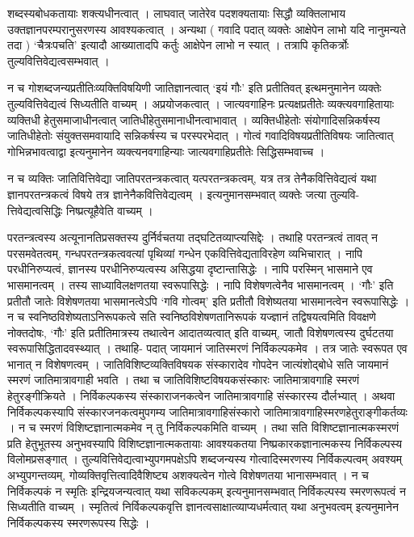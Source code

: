 {शब्दस्यबोधकतायाः शक्त्यधीनत्वात् । लाघवात् जातेरेव पदशक्यतायाः सिद्धौ व्यक्तिलाभाय उक्तज्ञानपरम्परानुसरणस्य आवश्यकत्वात् । अन्यथा ( गवादि पदात् व्यक्तेः आक्षेपेन लाभो यदि नानुमन्यते तदा ) ‘चैत्रःपचति’ इत्यादौ आख्यातादपि कर्तुः आक्षेपेन लाभो न स्यात् । तत्रापि कृतिकर्त्रोः तुल्यवित्तिवेद्यत्वसम्भवात् । 

न च गोशब्दजन्यप्रतीतिःव्यक्तिविषयिणी जातिज्ञानत्वात् ‘इयं गौः’ इति प्रतीतिवत् इत्थमनुमानेन व्यक्तेः तुल्यवित्तिवेद्यत्वं सिध्यतीति वाच्यम् । अप्रयोजकत्वात् ।  जात्यवगाहिनः प्रत्यक्षप्रतीतेः व्यक्त्यवगाहितायाः व्यक्तिधी हेतुसमाजाधीनत्वात् जातिधीहेतुसमानाधीनत्वाभावात् । व्यक्तिधीहेतोः संयोगादिसन्निकर्षस्य जातिधीहेतोः संयुक्तसमवायादि सन्निकर्षस्य च परस्परभेदात् । गोत्वं गवादिविषयप्रतीतिविषयः जातित्वात् गोभिन्नभावत्वाद्वा इत्यनुमानेन व्यक्त्यनवगाहिन्याः जात्यवगाहिप्रतीतेः सिद्धिसम्भवाच्च । 

न च व्यक्तिः जातिवित्तिवेद्या जातिपरतन्त्रकत्वात् यत्परतन्त्रकत्वम्, यत्र तत्र तेनैकवित्तिवेद्यत्वं यथा ज्ञानपरतन्त्रकत्वं विषये तत्र ज्ञानेनैकवित्तिवेद्यत्वम् । इत्यनुमानसम्भवात् व्यक्तेः जत्या तुल्यवि- त्तिवेद्यत्वसिद्धिः निष्प्रत्यूहैवेति वाच्यम् ।

परतन्त्रत्वस्य अत्यूनानतिप्रसक्तस्य दुर्निर्वचतया तद्घटितव्याप्त्यसिद्देः । तथाहि परतन्त्रत्वं तावत् न परसमवेतत्वम्, गन्धपरतन्त्रकत्ववत्यां पृथिव्यां गन्धेन एकवित्तिवेद्यताविरहेण व्यभिचारात् । नापि परधीनिरुप्यत्वं, ज्ञानस्य परधीनिरुप्यत्वस्य असिद्धया दृष्टान्तासिद्धेः । नापि परस्मिन् भासमाने एव भासमानत्वम् । तस्य साध्याविलक्षणतया स्वरूपासिद्धेः । नापि विशेषणत्वेनैव भासमानत्वम् । ‘गौः’ इति प्रतीतौ जातेः विशेषणतया भासमानत्वेऽपि ‘गवि गोत्वम्’ इति प्रतीतौ विशेष्यतया भासमानत्वेन स्वरूपासिद्धेः । न च स्वनिष्ठविशेष्यताऽनिरूपकत्वे सति स्वनिष्ठविशेषणतानिरूपकं यज्ज्ञानं तद्विषयत्वमिति विवक्षणे नोक्तदोषः, ‘गौः’ इति प्रतीतिमात्रस्य तथात्वेन आदातव्यत्वात् इति वाच्यम्, जातौ विशेषणत्वस्य दुर्घटतया स्वरूपासिद्धितादवस्थ्यात् । तथाहि- पदात् जायमानं जातिस्मरणं निर्विकल्पकमेव । तत्र जातेः स्वरूपत एव भानात् न विशेषणत्वम् । जातिविशिष्टव्यक्तिविषयक संस्कारादेव गोपदेन जात्यंशोद्बोधे सति जायमानं स्मरणं जातिमात्रावगाही भवति । तथा च जातिविशिष्टविषयकसंस्कारः जातिमात्रावगाहि स्मरणं हेतुरङ्गीक्रियते । निर्विकल्पकस्य संस्काराजनकत्वेन जातिमात्रावगाहि संस्कारस्य दौर्लभ्यात् । अथवा निर्विकल्पकस्यापि संस्कारजनकत्वमुपगम्य जातिमात्रावगाहिसंस्कारो जातिमात्रावगाहिस्मरणहेतुराङ्गीकर्तव्यः । न च स्मरणं विशिष्टज्ञानात्मकमेव न् तु निर्विकल्पकमिति वाच्यम् । तथा सति विशिष्टज्ञानात्मकस्मरणं प्रति हेतुभूतस्य अनुभवस्यापि विशिष्टज्ञानात्मकतायाः आवश्यकतया निष्प्रकारकज्ञानात्मकस्य निर्विकल्पस्य विलोमप्रसङ्गात् । तुल्यवित्तिवेद्यत्वाभ्युपगमपक्षेऽपि शब्दजन्यस्य गोत्वादिस्मरणस्य निर्विकल्पत्वम् अवश्यम् अभ्युपगन्तव्यम्, गोव्यक्तिवृत्तित्वादिवैशिष्ट्य अशक्यत्वेन गोत्वे विशेषणतया भानासम्भवात् । न च निर्विकल्पकं न स्मृतिः इन्द्रियजन्यत्वात् यथा सविकल्पकम् इत्यनुमानसम्भवात् निर्विकल्पस्य स्मरणरूपत्वं न सिध्यतीति वाच्यम् । स्मृतित्वं निर्विकल्पकवृत्ति ज्ञानत्वसाक्षात्व्याप्यधर्मत्वात् यथा अनुभवत्वम् इत्यनुमानेन निर्विकल्पकस्य स्मरणरूपस्य सिद्धेः ।

}
